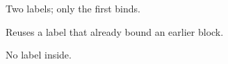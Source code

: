 \documentclass{article}
\begin{document}
\begin{theorem}\label{thm:first}\label{thm:second}
Two labels; only the first binds.
\end{theorem}

\begin{corollary}\label{thm:first}
Reuses a label that already bound an earlier block.
\end{corollary}

\begin{theorem}
No label inside.
\end{theorem}
\label{thm:outside}
\end{document}
